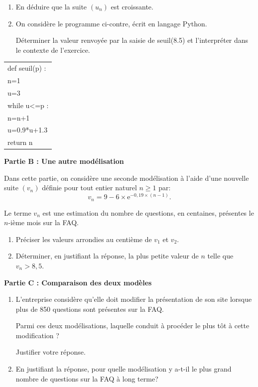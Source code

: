 \begin{minipage}{0.62\linewidth}
\begin{enumerate}[resume]
\item  En déduire que la suite $\left(u_n\right)$ est croissante.
\item On considère le programme ci-contre, écrit en langage Python.

Déterminer la valeur renvoyée par la saisie de seuil(8.5) et l'interpréter dans le contexte de l'exercice.
\end{enumerate}
\end{minipage}\hfill
\begin{minipage}{0.32\linewidth}
\renewcommand\arraystretch{0.9}
\begin{tabularx}{\linewidth}{|X|} \hline
def seuil(p) :\\
\qquad n=1\\
\qquad u=3\\
\qquad while u<=p :\\
\qquad  \qquad n=n+1\\
\qquad \qquad u=0.9*u+1.3 \\
\qquad return n\\ \hline
\end{tabularx}
\end{minipage}

\bigskip

\textbf{Partie B : Une autre modélisation}

\medskip

Dans cette partie, on considère une seconde modélisation à l'aide d'une nouvelle
suite $\left(v_n\right)$ définie pour tout entier naturel $n \geqslant 1$ par:
\[v_n = 9 - 6 \times \text{e}^{-0,19\times(n - 1)}.\]

Le terme $v_n$ est une estimation du nombre de questions, en centaines, présentes le $n$-ième mois sur la FAQ.

\medskip

\begin{enumerate}
\item Préciser les valeurs arrondies au centième de $v_1$ et $v_2$.
\item Déterminer, en justifiant la réponse, la plus petite valeur de $n$ telle que $v_n > 8,5$.
\end{enumerate}

\bigskip

\textbf{Partie C : Comparaison des deux modèles}

\medskip

\begin{enumerate}
\item L'entreprise considère qu'elle doit modifier la présentation de son site lorsque plus de 850 questions sont présentes sur la FAQ. 

Parmi ces deux modélisations, laquelle conduit à procéder le plus tôt à cette modification ?

Justifier votre réponse.
\item En justifiant la réponse, pour quelle modélisation y a-t-il le plus grand nombre de questions sur la FAQ à long terme?
\end{enumerate}

\bigskip
